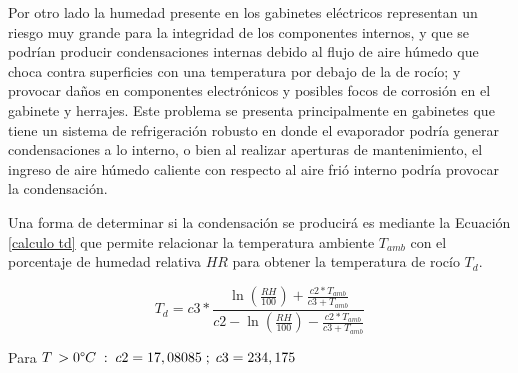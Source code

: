 Por otro lado la humedad presente en los gabinetes eléctricos representan un riesgo muy grande para la integridad de los componentes internos, y que se podrían producir condensaciones internas debido al flujo de aire húmedo que choca contra superficies con una temperatura por debajo de la de rocío; y provocar daños en componentes electrónicos y posibles focos de corrosión en el gabinete y herrajes. Este problema se presenta principalmente en gabinetes que tiene un sistema de refrigeración robusto en donde el evaporador podría generar condensaciones a lo interno, o bien al realizar aperturas de mantenimiento, el ingreso de aire húmedo caliente con respecto al aire frió interno podría provocar la condensación. \cite{risoul}

Una forma de determinar si la condensación se producirá es mediante la Ecuación \ref{calculo td}  que permite relacionar la temperatura ambiente $T_{amb}$ con el porcentaje de humedad relativa $HR$ para obtener la temperatura de rocío $T_{d}$.\cite{td}

\begin{equation}\label{calculo td}
    T_{d}= c3*\frac{\ln \left ( \frac{RH}{100} \right )+\frac{c2*T_{amb}}{c3+T_{amb}}}{c2-\ln \left ( \frac{RH}{100} \right )-\frac{c2*T_{amb}}{c3+T_{amb}}}
\end{equation}

Para $T\,>0\degree C\;:\;c2=17,08085\;;\;c3=234,175$